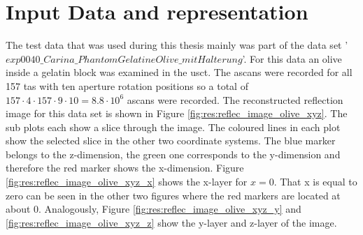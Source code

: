 \section{Input Data and representation}
The test data that was used during this thesis mainly was part of the data set '$exp0040\_Carina\_PhantomGelatineOlive\_mitHalterung$'. For this data an olive inside a gelatin block was examined in the \ac{usct}. The \acp{ascan} were recorded for all 157 \ac{tas} with ten aperture rotation positions so a total of $157\cdot4\cdot157\cdot9\cdot10 = 8.8\cdot10^6$ \acp{ascan} were recorded. The reconstructed reflection image for this data set is shown in Figure \ref{fig:res:reflec_image_olive_xyz}. The sub plots each show a slice through the image. The coloured lines in each plot show the selected slice in the other two coordinate systems. The blue marker belongs to the z-dimension, the green one corresponds to the y-dimension and therefore the red marker shows the x-dimension. Figure \ref{fig:res:reflec_image_olive_xyz_x} shows the x-layer for $x = 0$. That x is equal to zero can be seen in the other two figures where the red markers are located at about 0. Analogously, Figure \ref{fig:res:reflec_image_olive_xyz_y} and  \ref{fig:res:reflec_image_olive_xyz_z} show the y-layer and z-layer of the image.

